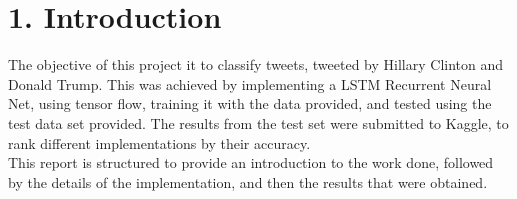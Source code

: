 \section*{1. Introduction} 


The objective of this project it to classify tweets, tweeted by Hillary Clinton and Donald Trump. This was achieved by implementing a LSTM Recurrent Neural Net, using tensor flow, training it with the data provided, and tested using the test data set provided. The results from the test set were submitted to Kaggle, to rank different implementations by their accuracy.\\

	This report is structured to provide an introduction to the work done, followed by the details of the implementation, and then the results that were obtained. 	

